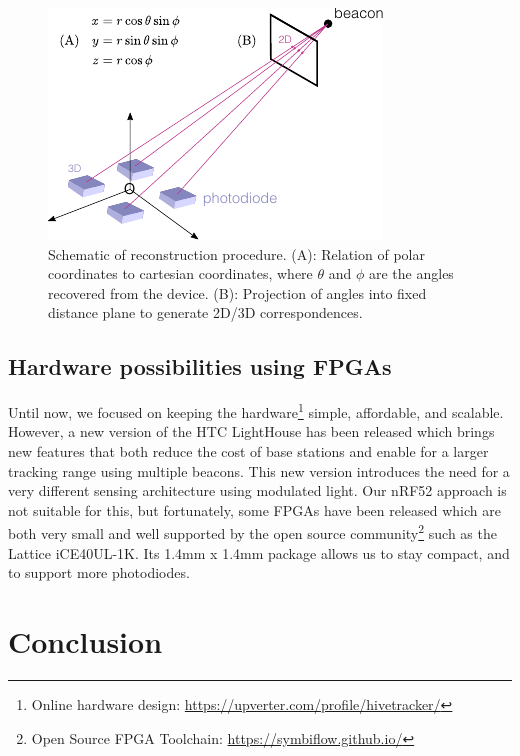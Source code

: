\documentclass[sigchi]{acmart}
\begin{document}
\begin{figure}[h]
\centering
\includegraphics[width=1.0\columnwidth]{Figures/reconstruction.pdf}
\caption{Schematic of reconstruction procedure. (A): Relation of polar coordinates to cartesian coordinates, where $\theta$ and $\phi$ are the angles recovered from the device. (B): Projection of angles into fixed distance plane to generate 2D/3D correspondences.}
\label{Fig:Reconstruction}
\end{figure}


\subsection{Hardware possibilities using FPGAs}

Until now, we focused on keeping the hardware\footnote{Online hardware design: \url{https://upverter.com/profile/hivetracker/}} simple, affordable, and scalable. However, a new version of the HTC LightHouse has been released which brings new features that both reduce the cost of base stations and enable for a larger tracking range using multiple beacons. This new version introduces the need for a very different sensing architecture using modulated light. Our nRF52 approach is not suitable for this, but fortunately, some FPGAs have been released which are both very small and well supported by the open source community\footnote{Open Source FPGA Toolchain: \url{https://symbiflow.github.io/}} such as the Lattice iCE40UL-1K. Its 1.4mm x 1.4mm package allows us to stay compact, and to support more photodiodes.


\section{Conclusion}
\end{document}
